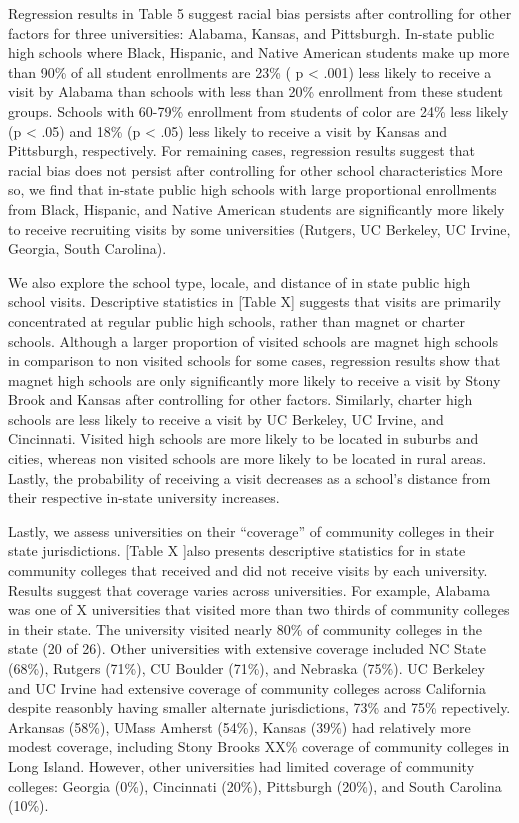 \documentclass[twoside]{article}
\begin{document}
Regression results in Table 5 suggest racial bias persists after controlling for other factors for three universities: Alabama, Kansas, and Pittsburgh. In-state public high schools where Black, Hispanic, and Native American students make up more than  90\% of all student enrollments are 23\% ( p < .001) less likely to receive a visit by Alabama than schools with less than 20\% enrollment from these student groups. Schools with 60-79\% enrollment from students of color are 24\% less likely (p < .05) and 18\% (p < .05) less likely to receive a visit by Kansas and Pittsburgh, respectively. For remaining cases, regression results suggest that racial bias does not persist after controlling for other school characteristics More so, we find that in-state public high schools with large proportional enrollments from Black, Hispanic, and Native American students are significantly more likely to receive recruiting visits by some universities (Rutgers, UC Berkeley, UC Irvine, Georgia, South Carolina).

We also explore the school type, locale, and distance of in state public high school visits. Descriptive statistics in [Table X] suggests that visits are primarily concentrated at regular public high schools, rather than magnet or charter schools. Although a larger proportion of visited schools are magnet high schools in comparison to non visited schools for some cases, regression results show that magnet high schools are only significantly more likely to receive a visit by Stony Brook and Kansas after controlling for other factors. Similarly, charter high schools are less likely to receive a visit by UC Berkeley, UC Irvine, and Cincinnati. Visited high schools are more likely to be located in suburbs and cities, whereas non visited schools are more likely to be located in rural areas.  Lastly, the probability of receiving a visit decreases as a school’s distance from their respective in-state university increases.

Lastly, we assess universities on their “coverage” of community colleges in their state jurisdictions. [Table X ]also presents descriptive statistics for in state community colleges that received and did not receive visits by each university. Results suggest that coverage varies across universities. For example, Alabama was one of X universities that visited more than two thirds of community colleges in their state. The university visited nearly 80\% of community colleges in the state (20 of 26). Other universities with extensive coverage included NC State (68\%), Rutgers (71\%), CU Boulder (71\%), and Nebraska (75\%).  UC Berkeley and UC Irvine had extensive coverage of community colleges across California despite reasonbly having smaller alternate jurisdictions, 73\% and 75\% repectively. Arkansas (58\%), UMass Amherst (54\%), Kansas (39\%) had relatively more modest coverage, including Stony Brooks XX\% coverage of community colleges in Long Island. However, other universities had limited coverage of community colleges: Georgia (0\%), Cincinnati (20\%), Pittsburgh (20\%), and South Carolina (10\%). 
\end{document}

